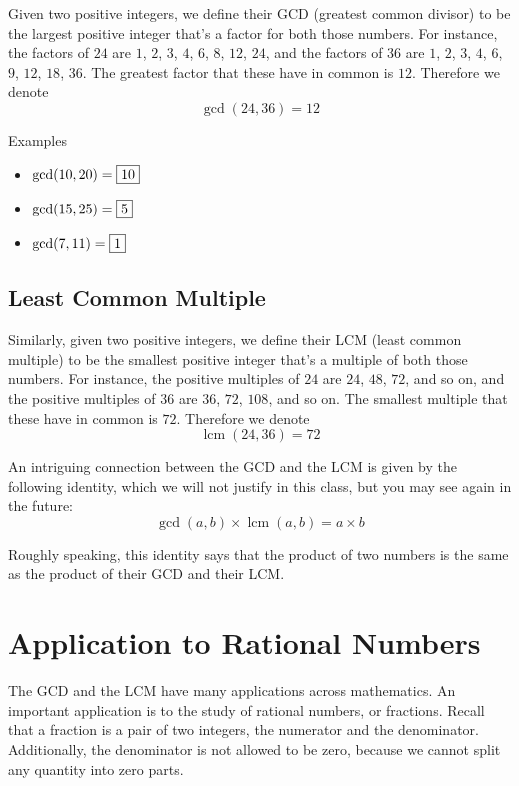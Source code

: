 \documentclass[a4paper,10pt]{report}
\begin{document}
Given two positive integers, we define their GCD (greatest common divisor) to
be the largest positive integer that's a factor for both those numbers. For
instance, the factors of \(24\) are \(1\), \(2\), \(3\), \(4\), \(6\), \(8\),
\(12\), \(24\), and the factors of \(36\) are \(1\), \(2\), \(3\), \(4\),
\(6\), \(9\), \(12\), \(18\), \(36\). The greatest factor that these have in
common is \(12\). Therefore we denote \[ \gcd(24, 36) = 12 \]

\begin{problem}{Examples}
 \begin{itemize}
  \item \(\gcd(10, 20) = \Ans{10}\)
  \item \(\gcd(15, 25) = \Ans{5}\)
  \item \(\gcd(7, 11) = \Ans{1}\)
 \end{itemize}
\end{problem}

\subsection{Least Common Multiple}

Similarly, given two positive integers, we define their LCM (least common
multiple) to be the smallest positive integer that's a multiple of both those
numbers. For instance, the positive multiples of \(24\) are \(24\), \(48\),
\(72\), and so on, and the positive multiples of \(36\) are \(36\), \(72\),
\(108\), and so on. The smallest multiple that these have in common is \(72\).
Therefore we denote \[
 \operatorname{lcm}(24, 36) = 72
\]

An intriguing connection between the GCD and the LCM is given by the following
identity, which we will not justify in this class, but you may see again in the
future: \begin{equation}
 \gcd(a, b) \times \operatorname{lcm}(a, b) = a \times b
\end{equation}

Roughly speaking, this identity says that the product of two numbers is the
same as the product of their GCD and their LCM.

\section{Application to Rational Numbers}

The GCD and the LCM have many applications across mathematics. An important
application is to the study of rational numbers, or fractions. Recall that a
fraction is a pair of two integers, the numerator and the denominator.
Additionally, the denominator is not allowed to be zero, because we cannot
split any quantity into zero parts.
\end{document}
